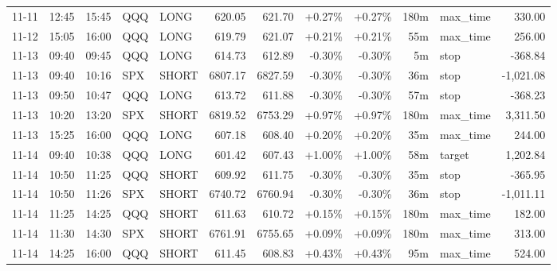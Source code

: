 \documentclass[11pt,a4paper,twoside]{article}
\begin{document}
\begin{center}
\begin{longtable}{>{\color{txtmain}}l l l l l r r r r r >{\color{txtmain}}l r}
11-11 & 12:45 & 15:45 & QQQ & LONG & 620.05 & 621.70 & \textcolor{wingreen}{+0.27\%} & \textcolor{wingreen}{+0.27\%} & 180m & max\_time & \textcolor{wingreen}{330.00} \\
11-12 & 15:05 & 16:00 & QQQ & LONG & 619.79 & 621.07 & \textcolor{wingreen}{+0.21\%} & \textcolor{wingreen}{+0.21\%} & 55m & max\_time & \textcolor{wingreen}{256.00} \\
11-13 & 09:40 & 09:45 & QQQ & LONG & 614.73 & 612.89 & \textcolor{lossred}{-0.30\%} & \textcolor{lossred}{-0.30\%} & 5m & stop & \textcolor{lossred}{-368.84} \\
11-13 & 09:40 & 10:16 & SPX & SHORT & 6807.17 & 6827.59 & \textcolor{lossred}{-0.30\%} & \textcolor{lossred}{-0.30\%} & 36m & stop & \textcolor{lossred}{-1,021.08} \\
11-13 & 09:50 & 10:47 & QQQ & LONG & 613.72 & 611.88 & \textcolor{lossred}{-0.30\%} & \textcolor{lossred}{-0.30\%} & 57m & stop & \textcolor{lossred}{-368.23} \\
11-13 & 10:20 & 13:20 & SPX & SHORT & 6819.52 & 6753.29 & \textcolor{wingreen}{+0.97\%} & \textcolor{wingreen}{+0.97\%} & 180m & max\_time & \textcolor{wingreen}{3,311.50} \\
11-13 & 15:25 & 16:00 & QQQ & LONG & 607.18 & 608.40 & \textcolor{wingreen}{+0.20\%} & \textcolor{wingreen}{+0.20\%} & 35m & max\_time & \textcolor{wingreen}{244.00} \\
11-14 & 09:40 & 10:38 & QQQ & LONG & 601.42 & 607.43 & \textcolor{wingreen}{+1.00\%} & \textcolor{wingreen}{+1.00\%} & 58m & target & \textcolor{wingreen}{1,202.84} \\
11-14 & 10:50 & 11:25 & QQQ & SHORT & 609.92 & 611.75 & \textcolor{lossred}{-0.30\%} & \textcolor{lossred}{-0.30\%} & 35m & stop & \textcolor{lossred}{-365.95} \\
11-14 & 10:50 & 11:26 & SPX & SHORT & 6740.72 & 6760.94 & \textcolor{lossred}{-0.30\%} & \textcolor{lossred}{-0.30\%} & 36m & stop & \textcolor{lossred}{-1,011.11} \\
11-14 & 11:25 & 14:25 & QQQ & SHORT & 611.63 & 610.72 & \textcolor{wingreen}{+0.15\%} & \textcolor{wingreen}{+0.15\%} & 180m & max\_time & \textcolor{wingreen}{182.00} \\
11-14 & 11:30 & 14:30 & SPX & SHORT & 6761.91 & 6755.65 & \textcolor{wingreen}{+0.09\%} & \textcolor{wingreen}{+0.09\%} & 180m & max\_time & \textcolor{wingreen}{313.00} \\
11-14 & 14:25 & 16:00 & QQQ & SHORT & 611.45 & 608.83 & \textcolor{wingreen}{+0.43\%} & \textcolor{wingreen}{+0.43\%} & 95m & max\_time & \textcolor{wingreen}{524.00} \\

\end{longtable}
\end{center}
\end{document}
